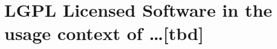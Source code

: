 %
%
%
%
%



\section{LGPL Licensed Software in the usage context of \ldots [tbd]}
\label{OSUC-01-LGPL} \label{OSUC-03-LGPL} 
\label{OSUC-06-LGPL} \label{OSUC-09-LGPL}

\label{OSUC-02-LGPL} \label{OSUC-04-LGPL} \label{OSUC-05-LGPL}
\label{OSUC-07-LGPL} \label{OSUC-08-LGPL} \label{OSUC-10-LGPL}


%
